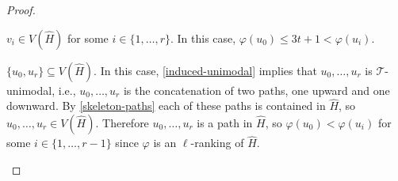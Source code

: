 \documentclass[kpfonts]{patmorin}
\theoremstyle{named}
\begin{document}
\begin{proof}
\begin{compactenum}
\begin{compactenum}
            \item $v_i\in V(\hat{H})$ for some $i\in\{1,\ldots,r\}$. In this case, $\varphi(u_0)\le 3t+1 < \varphi(u_i)$.
        \end{compactenum}
        \item $\{u_0,u_r\}\subseteq V(\hat{H})$. In this case, \cref{induced-unimodal} implies that $u_0,\ldots,u_r$ is $\mathcal{T}$-unimodal, i.e., $u_0,\ldots,u_r$ is the concatenation of two paths, one upward and one downward.  By \cref{skeleton-paths} each of these paths is contained in $\hat{H}$, so $u_0,\ldots,u_r\in V(\hat{H})$.
        Therefore $u_0,\ldots,u_r$ is a path in $\hat{H}$, so  $\varphi(u_0)<\varphi(u_i)$ for some $i\in\{1,\ldots,r-1\}$ since $\varphi$ is an $\ell$-ranking of $\hat{H}$.

    \end{compactenum}
\end{proof}
\end{document}
